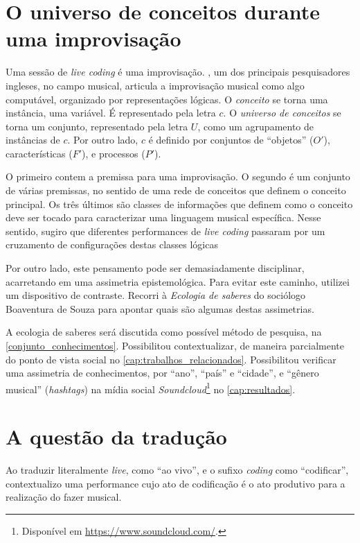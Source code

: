 \section{O universo de conceitos durante uma improvisação}\label{sec:universo}

Uma sessão de \emph{live coding} é uma improvisação. , um dos principais pesquisadores ingleses, no campo musical, articula a improvisação musical como algo computável, organizado por representações lógicas. O \emph{conceito} se torna uma instância, uma variável. É representado pela letra $c$. O  \emph{universo de conceitos} se torna um conjunto, representado pela letra $U$, como um agrupamento de instâncias de $c$. Por outro lado, $c$ é definido por conjuntos de ``objetos'' ($O'$), características ($F'$), e processos ($P'$). 

O primeiro contem a premissa para uma improvisação. O segundo é um conjunto de várias premissas, no sentido de uma rede de conceitos que definem o conceito principal. Os três últimos são classes de informações que definem como o conceito deve ser tocado para caracterizar uma linguagem musical específica. Nesse sentido, sugiro que diferentes performances de \emph{live coding} passaram por um cruzamento de configurações destas classes lógicas

Por outro lado, este pensamento pode ser demasiadamente disciplinar, acarretando em uma assimetria epistemológica. Para evitar este caminho, utilizei um dispositivo de contraste. Recorri à \emph{Ecologia de saberes} do sociólogo Boaventura de Souza  para apontar quais são algumas destas assimetrias.

A ecologia de saberes será discutida como possível método de pesquisa, na \autoref{conjunto_conhecimentos}. Possibilitou contextualizar, de maneira parcialmente do ponto de vista social no \autoref{cap:trabalhos_relacionados}. Possibilitou verificar uma assimetria de conhecimentos, por ``ano'', ``país'' e ``cidade'', e ``gênero musical'' (\emph{hashtags}) na mídia social \emph{Soundcloud}\footnote{Disponível em \url{https://www.soundcloud.com/}.} no \autoref{cap:resultados}.

\section{A questão da tradução}\label{sec:traducao}

Ao traduzir literalmente \emph{live}, como ``ao vivo'', e o sufixo \emph{coding} como ``codificar'', contextualizo uma performance cujo ato de codificação é o ato produtivo para a realização do fazer musical.

